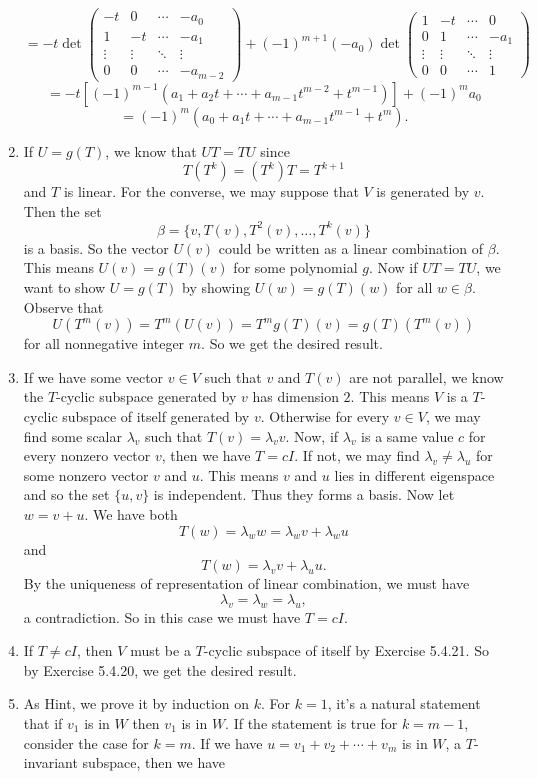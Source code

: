 \begin{enumerate}
\[=-t\det\begin{pmatrix}-t&0&\cdots &-a_0\\1&-t&\cdots&-a_1\\\vdots &\vdots&\ddots &\vdots \\0&0&\cdots &-a_{m-2}\end{pmatrix}+(-1)^{m+1}(-a_0)\det\begin{pmatrix}1&-t&\cdots &0\\0&1&\cdots &-a_1\\\vdots &\vdots &\ddots&\vdots \\0&0&\cdots &1\end{pmatrix}\]
\[=-t[(-1)^{m-1}(a_1+a_2t+\cdots +a_{m-1}t^{m-2}+t^{m-1})]+(-1)^ma_0\]
\[=(-1)^m(a_0+a_1t+\cdots +a_{m-1}t^{m-1}+t^m).\]
\item If $U=g(T)$, we know that $UT=TU$ since 
\[T(T^k)=(T^k)T=T^{k+1}\]
and $T$ is linear. For the converse, we may suppose that $V$ is generated by $v$. Then the set 
\[\beta=\{v,T(v),T^2(v),\ldots ,T^k(v)\}\]
is a basis. So the vector $U(v)$ could be written as a linear combination of $\beta$. This means $U(v)=g(T)(v)$ for some polynomial $g$. Now if $UT=TU$, we want to show $U=g(T)$ by showing $U(w)=g(T)(w)$ for all $w\in \beta$. Observe that 
\[U(T^m(v))=T^m(U(v))=T^mg(T)(v)=g(T)(T^m(v))\]
for all nonnegative integer $m$. So we get the desired result.
\item If we have some vector $v\in V$ such that $v$ and $T(v)$ are not parallel, we know the $T$-cyclic subspace generated by $v$ has dimension $2$. This means $V$ is a $T$-cyclic subspace of itself generated by $v$. Otherwise for every $v\in V$, we may find some scalar $\lambda_v$ such that $T(v)=\lambda_vv$. Now, if $\lambda_v$ is a same value $c$ for every nonzero vector $v$, then we have $T=cI$. If not, we may find $\lambda_v\neq\lambda_u$ for some nonzero vector $v$ and $u$. This means $v$ and $u$ lies in different eigenspace and so the set $\{u,v\}$ is independent. Thus they forms a basis. Now let $w=v+u$. We have both
\[T(w)=\lambda_ww=\lambda_wv+\lambda_wu\]
and 
\[T(w)=\lambda_vv+\lambda_uu.\]
By the uniqueness of representation of linear combination, we must have 
\[\lambda_v=\lambda_w=\lambda_u,\]
a contradiction. So in this case we must have $T=cI$.
\item If $T\neq cI$, then $V$ must be a $T$-cyclic subspace of itself by Exercise 5.4.21. So by Exercise 5.4.20, we get the desired result.
\item As Hint, we prove it by induction on $k$. For $k=1$, it's a natural statement that if $v_1$ is in $W$ then $v_1$ is in $W$. If the statement is true for $k=m-1$, consider the case for $k=m$. If we have $u=v_1+v_2+\cdots +v_m$ is in $W$, a $T$-invariant subspace, then we have 

\end{enumerate}
